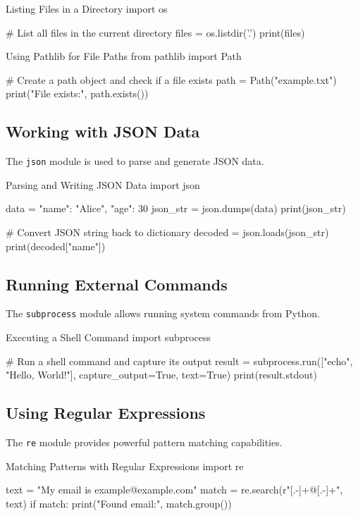 \begin{codeonly}{Listing Files in a Directory}
import os

# List all files in the current directory
files = os.listdir('.')
print(files)
\end{codeonly}

\begin{codeonly}{Using Pathlib for File Paths}
from pathlib import Path

# Create a path object and check if a file exists
path = Path("example.txt")
print("File exists:", path.exists())
\end{codeonly}

\subsection{Working with JSON Data}
The \texttt{json} module is used to parse and generate JSON data.

\begin{codeonly}{Parsing and Writing JSON Data}
import json

data = {"name": "Alice", "age": 30}
json_str = json.dumps(data)
print(json_str)

# Convert JSON string back to dictionary
decoded = json.loads(json_str)
print(decoded["name"])
\end{codeonly}

\subsection{Running External Commands}
The \texttt{subprocess} module allows running system commands from Python.

\begin{codeonly}{Executing a Shell Command}
import subprocess

# Run a shell command and capture its output
result = subprocess.run(["echo", "Hello, World!"], capture_output=True, text=True)
print(result.stdout)
\end{codeonly}

\subsection{Using Regular Expressions}
The \texttt{re} module provides powerful pattern matching capabilities.

\begin{codeonly}{Matching Patterns with Regular Expressions}
import re

text = "My email is example@example.com"
match = re.search(r"[\w.-]+@[\w.-]+", text)
if match:
    print("Found email:", match.group())
\end{codeonly}

